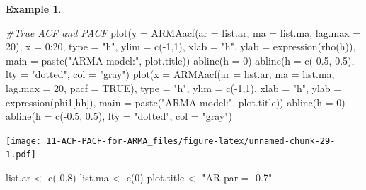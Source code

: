 \documentclass[
]{book}
\newenvironment{Shaded}{\begin{snugshade}}{\end{snugshade}}
\newcommand{\AttributeTok}[1]{\textcolor[rgb]{0.77,0.63,0.00}{#1}}
\newcommand{\CommentTok}[1]{\textcolor[rgb]{0.56,0.35,0.01}{\textit{#1}}}
\newcommand{\ConstantTok}[1]{\textcolor[rgb]{0.00,0.00,0.00}{#1}}
\newcommand{\DecValTok}[1]{\textcolor[rgb]{0.00,0.00,0.81}{#1}}
\newcommand{\FloatTok}[1]{\textcolor[rgb]{0.00,0.00,0.81}{#1}}
\newcommand{\FunctionTok}[1]{\textcolor[rgb]{0.00,0.00,0.00}{#1}}
\newcommand{\NormalTok}[1]{#1}
\newcommand{\OtherTok}[1]{\textcolor[rgb]{0.56,0.35,0.01}{#1}}
\newcommand{\SpecialCharTok}[1]{\textcolor[rgb]{0.00,0.00,0.00}{#1}}
\newcommand{\StringTok}[1]{\textcolor[rgb]{0.31,0.60,0.02}{#1}}
\theoremstyle{definition}
\theoremstyle{definition}
\newtheorem{example}{Example}[chapter]
\theoremstyle{definition}
\theoremstyle{definition}
\theoremstyle{remark}
\begin{document}
\begin{example}
\begin{Shaded}
\begin{Highlighting}[]
  
  \CommentTok{\#True ACF and PACF}
  \FunctionTok{plot}\NormalTok{(}\AttributeTok{y =} \FunctionTok{ARMAacf}\NormalTok{(}\AttributeTok{ar =}\NormalTok{ list.ar, }\AttributeTok{ma =}\NormalTok{ list.ma, }\AttributeTok{lag.max =} \DecValTok{20}\NormalTok{), }\AttributeTok{x =} \DecValTok{0}\SpecialCharTok{:}\DecValTok{20}\NormalTok{, }\AttributeTok{type =} \StringTok{"h"}\NormalTok{, }\AttributeTok{ylim =} \FunctionTok{c}\NormalTok{(}\SpecialCharTok{{-}}\DecValTok{1}\NormalTok{,}\DecValTok{1}\NormalTok{), }\AttributeTok{xlab =} \StringTok{"h"}\NormalTok{, }\AttributeTok{ylab =} \FunctionTok{expression}\NormalTok{(}\FunctionTok{rho}\NormalTok{(h)),}
    \AttributeTok{main =} \FunctionTok{paste}\NormalTok{(}\StringTok{"ARMA model:"}\NormalTok{, plot.title))}
  \FunctionTok{abline}\NormalTok{(}\AttributeTok{h =} \DecValTok{0}\NormalTok{)}
  \FunctionTok{abline}\NormalTok{(}\AttributeTok{h =} \FunctionTok{c}\NormalTok{(}\SpecialCharTok{{-}}\FloatTok{0.5}\NormalTok{, }\FloatTok{0.5}\NormalTok{), }\AttributeTok{lty =} \StringTok{"dotted"}\NormalTok{, }\AttributeTok{col =} \StringTok{"gray"}\NormalTok{)}
  \FunctionTok{plot}\NormalTok{(}\AttributeTok{x =} \FunctionTok{ARMAacf}\NormalTok{(}\AttributeTok{ar =}\NormalTok{ list.ar, }\AttributeTok{ma =}\NormalTok{ list.ma, }\AttributeTok{lag.max =} \DecValTok{20}\NormalTok{, }\AttributeTok{pacf =} \ConstantTok{TRUE}\NormalTok{), }\AttributeTok{type =} \StringTok{"h"}\NormalTok{, }\AttributeTok{ylim =} \FunctionTok{c}\NormalTok{(}\SpecialCharTok{{-}}\DecValTok{1}\NormalTok{,}\DecValTok{1}\NormalTok{), }\AttributeTok{xlab =} \StringTok{"h"}\NormalTok{, }\AttributeTok{ylab =} \FunctionTok{expression}\NormalTok{(phi1[hh]),}
    \AttributeTok{main =} \FunctionTok{paste}\NormalTok{(}\StringTok{"ARMA model:"}\NormalTok{, plot.title))}
  \FunctionTok{abline}\NormalTok{(}\AttributeTok{h =} \DecValTok{0}\NormalTok{)}
  \FunctionTok{abline}\NormalTok{(}\AttributeTok{h =} \FunctionTok{c}\NormalTok{(}\SpecialCharTok{{-}}\FloatTok{0.5}\NormalTok{, }\FloatTok{0.5}\NormalTok{), }\AttributeTok{lty =} \StringTok{"dotted"}\NormalTok{, }\AttributeTok{col =} \StringTok{"gray"}\NormalTok{)}
\end{Highlighting}
\end{Shaded}

\texttt{[image: 11-ACF-PACF-for-ARMA\_files/figure-latex/unnamed-chunk-29-1.pdf]}

\begin{Shaded}
\begin{Highlighting}[]
\NormalTok{list.ar }\OtherTok{\textless{}{-}} \FunctionTok{c}\NormalTok{(}\SpecialCharTok{{-}}\FloatTok{0.8}\NormalTok{)}
\NormalTok{list.ma }\OtherTok{\textless{}{-}} \FunctionTok{c}\NormalTok{(}\DecValTok{0}\NormalTok{)}
\NormalTok{plot.title }\OtherTok{\textless{}{-}} \StringTok{"AR par = {-}0.7"}
\end{Highlighting}
\end{Shaded}


\end{example}
\end{document}

